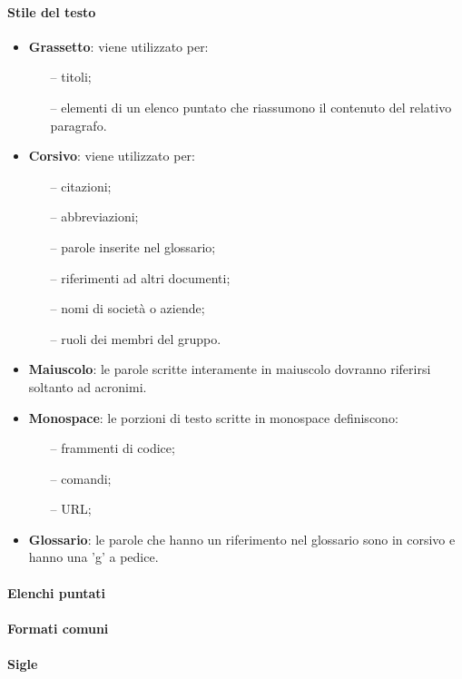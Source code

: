  \paragraph{Stile del testo} 
\begin{itemize}
	\item \textbf{Grassetto}: viene utilizzato per:
	\begin{itemize}
		\item[--]titoli;
		\item[--]elementi di un elenco puntato che riassumono il contenuto del relativo paragrafo.
	\end{itemize}
	\item \textbf{Corsivo}: viene utilizzato per:
	\begin{itemize}
		\item[--]citazioni;
		\item[--]abbreviazioni;
		\item[--]parole inserite nel glossario;
		\item[--]riferimenti ad altri documenti;
		\item[--]nomi di società o aziende;
		\item[--]ruoli dei membri del gruppo.
	\end{itemize}
	\item \textbf{Maiuscolo}: le parole scritte interamente in maiuscolo dovranno riferirsi soltanto ad acronimi.
	\item \textbf{Monospace}: le porzioni di testo scritte in monospace definiscono:
	\begin{itemize}
		\item[--]frammenti di codice;
		\item[--]comandi;
		\item[--]URL;
	\end{itemize}
	\item \textbf{Glossario}: le parole che hanno un riferimento nel glossario sono in corsivo e hanno una 'g' a pedice.
\end{itemize}
 \paragraph{Elenchi puntati}
 \paragraph{Formati comuni}
 \paragraph{Sigle}
 
